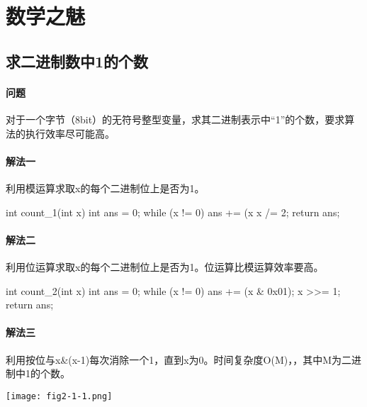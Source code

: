 \chapter{数学之魅}

\section{求二进制数中1的个数} %
\label{sec:number-of-1s-in-binary}


\subsubsection{问题}
对于一个字节（8bit）的无符号整型变量，求其二进制表示中“1”的个数，要求算法的执行效率尽可能高。

\subsubsection{解法一}
利用模运算求取x的每个二进制位上是否为1。
\begin{Codex}[label={[$O(lg(x))+O(1)$]Chap02_01_NumberOfOnes.java}]
int count_1(int x) {
    int ans = 0;
    while (x != 0) {
        ans += (x %
        x /= 2;
    }
    return ans;
}
\end{Codex}

\subsubsection{解法二}
利用位运算求取x的每个二进制位上是否为1。位运算比模运算效率要高。
\begin{Codex}[label={[$O(lg(x))+O(1)$]Chap02_01_NumberOfOnes.java}]
int count_2(int x) {
    int ans = 0;
    while (x != 0) {
        ans += (x & 0x01);
        x >>= 1;
    }
    return ans;
}
\end{Codex}

\subsubsection{解法三}
利用按位与x\&(x-1)每次消除一个1，直到x为0。时间复杂度O(M)，，其中M为二进制中1的个数。
\begin{center}
	\texttt{[image: fig2-1-1.png]}\\
	\label{fig:number-of-ones-1}
\end{center}

